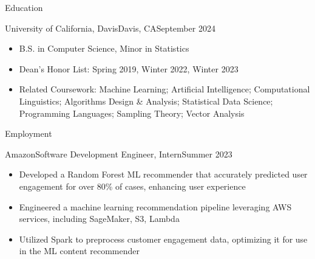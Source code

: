 \documentclass[calibri]{mcdowellcv}
\begin{document}
	\makeheader
	
	\begin{cvsection}{Education}
		\begin{cvsubsection}{University of California, Davis}{Davis, CA}{September 2024}
			\begin{itemize}
				\item B.S. in Computer Science, Minor in Statistics
				\item Dean's Honor List: Spring 2019, Winter 2022, Winter 2023
				\item Related Coursework: Machine Learning; Artificial Intelligence; Computational Linguistics; Algorithms Design \& Analysis; Statistical Data Science; Programming Languages; Sampling Theory; Vector Analysis
			\end{itemize}
		\end{cvsubsection}
	\end{cvsection}

	\begin{cvsection}{Employment}
		\begin{cvsubsection}{Amazon}{Software Development Engineer, Intern}{Summer 2023}			
			\begin{itemize}
				\item Developed a Random Forest ML recommender that accurately predicted user engagement for over 80\% of cases, enhancing user experience
				\item Engineered a machine learning recommendation pipeline leveraging AWS services, including SageMaker, S3, Lambda
				\item Utilized Spark to preprocess customer engagement data, optimizing it for use in the ML content recommender
			\end{itemize}
		\end{cvsubsection}
	\end{cvsection}
	
\end{document}
